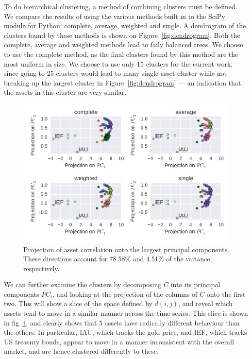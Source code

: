 To do hierarchical clustering, a method of combining clusters must be defined.
We compare the results of using the various methods built in to the SciPy module for Python: complete, average, weighted and single.
A dendrogram of the clusters found by these methods is shown on Figure~\ref{fig:dendrogram}.
Both the complete, average and weighted methods lead to faily balanced trees.
We choose to use the complete method, as the final clusters found by this method are the most uniform in size.
We choose to use only 15 clusters for the current work, since going to 25 clusters would lead to many single-asset cluster while not breaking up the largest cluster in Figure~\ref{fig:dendrogram} --- an indication that the assets in this cluster are very similar.

\begin{figure}[tp]
\centering
\includegraphics{../pic/pca_methods.pdf}
\caption{Projection of asset correlation onto the largest principal components. These directions account for 78.58\% and 4.51\% of the variance, respectively.}
\label{fig:pca}
\end{figure}

We can further examine the clusters by decomposing $C$ into its principal components $PC_i$, and looking at the projection of the columns of $C$ onto the first two.
This will show a slice of the space defined by $d(i,j)$, and reveal which assets tend to move in a similar manner across the time series.
This slice is shown in fig~\ref{fig:pca}, and clearly shows that 5 assets have radically different behaviour than the others.
In particular, IAU, which tracks the gold price, and IEF, which tracks US treasury bonds, appear to move in a manner inconsistent with the overall market, and are hence clustered differently to these.

